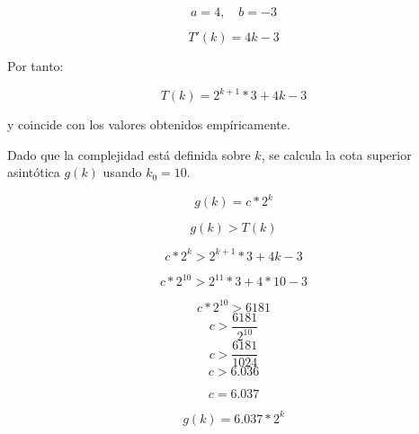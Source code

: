 \documentclass{uc3mpracticas}
\begin{document}
$$ a = 4 , \quad b = -3$$

$$ T'(k) = 4k - 3 $$

Por tanto:

$$ T(k) = 2^{k+1} * 3 + 4k - 3 $$

y coincide con los valores obtenidos empíricamente.

\vspace{2mm}

Dado que la complejidad está definida sobre $k$, se calcula la cota superior asintótica $g(k)$ usando $k_0 = 10$.

$$ g(k) = c*2^k $$

$$ g(k) > T(k) $$

$$ c*2^k > 2^{k+1} * 3 + 4k - 3 $$

$$ c*2^{10} > 2^{11} * 3 + 4*10 - 3 $$

$$ c*2^{10} > 6181 $$
$$ c > \frac{6181}{2^{10}} $$
$$ c > \frac{6181}{1024} $$
$$ c > 6.036 $$

$$ c = 6.037 $$

$$ g(k) = 6.037*2^k $$

\vspace{2mm}
\end{document}
